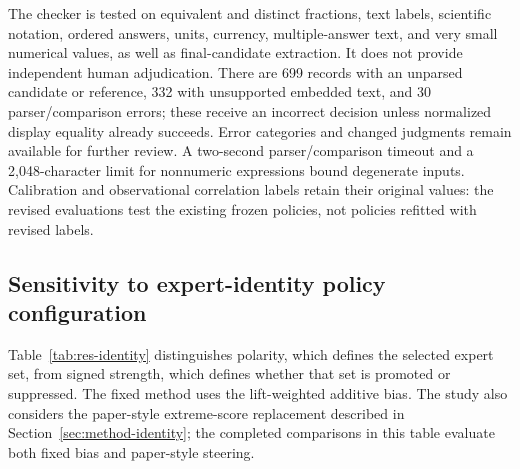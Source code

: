 \documentclass[12pt,a4paper,twoside,openright]{book}
\begin{document}
The checker is tested on equivalent and distinct fractions, text labels,
scientific notation, ordered answers, units, currency, multiple-answer text,
and very small numerical values, as well as final-candidate extraction.
It does not provide independent human adjudication. There are 699 records
with an unparsed candidate or reference, 332 with unsupported embedded
text, and 30 parser/comparison errors; these receive an incorrect decision
unless normalized display equality already succeeds. Error categories
and changed judgments remain available for further review. A two-second
parser/comparison timeout and a 2,048-character limit for nonnumeric
expressions bound degenerate inputs. Calibration and observational
correlation labels retain their original values: the revised evaluations
test the existing frozen policies, not policies refitted with revised labels.


\subsection{Sensitivity to expert-identity policy configuration}

Table~\ref{tab:res-identity} distinguishes polarity, which defines the
selected expert set, from signed strength, which defines whether that set
is promoted or suppressed. The fixed method uses the lift-weighted additive
bias. The study also considers the paper-style extreme-score
replacement described in Section~\ref{sec:method-identity}; the completed
comparisons in this table evaluate both fixed bias and paper-style steering.
\end{document}
